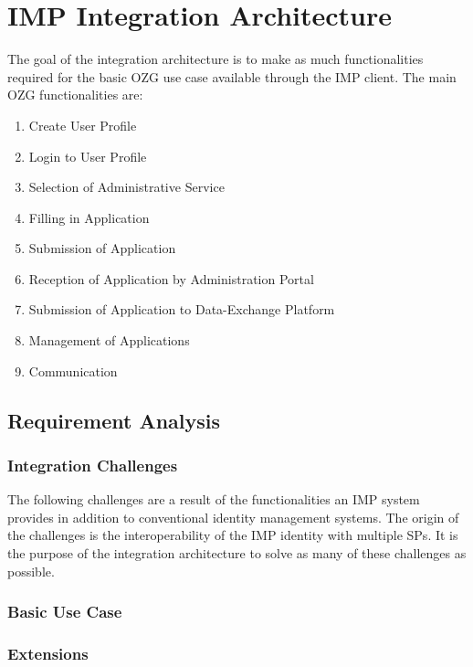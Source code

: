 \documentclass[
     12pt,         %
     a4paper,      %
     BCOR=10mm,version=first,     %
     DIV=14,version=first,        %
     ]{scrreprt}
\begin{document}
\chapter{IMP Integration Architecture}

The goal of the integration architecture is to make as much functionalities required for the basic OZG use case available through the IMP client. The main OZG functionalities are:
\begin{enumerate}
    \item{Create User Profile}
    \item{Login to User Profile}
    \item{Selection of Administrative Service}
    \item{Filling in Application}
    \item{Submission of Application}
    \item{Reception of Application by Administration Portal}
    \item{Submission of Application to Data-Exchange Platform}
    \item{Management of Applications}
    \item{Communication}
\end{enumerate}

\section{Requirement Analysis}

\subsection{Integration Challenges}

The following challenges are a result of the functionalities an IMP system provides in addition to conventional identity management systems. The origin of the challenges is the interoperability of the IMP identity with multiple SPs. It is the purpose of the integration architecture to solve as many of these challenges as possible.

\subsection{Basic Use Case}

\subsection{Extensions}
\end{document}
